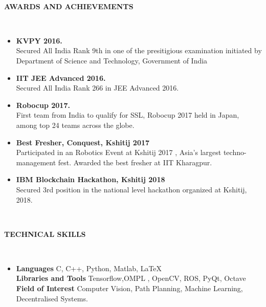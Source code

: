 \documentclass[a4paper,8pt]{article}
\newcommand{\lsep}{-0.5cm}
\newcommand{\resheading}[1]{{\small \colorbox{mygrey}{\begin{minipage}{0.975\textwidth}{\textbf{#1 \vphantom{p\^{E}}}}\end{minipage}}}}
\begin{document}
\hspace{0.5cm}\\[-0.2cm]
\resheading{\textbf{AWARDS AND ACHIEVEMENTS} }\\[\lsep]
\begin{itemize}
\item \noindent \textbf{KVPY 2016.} \\
Secured All India Rank 9th in one of the presitigious examination initiated by Department of Science and Technology, Government of India

\item \noindent \textbf{IIT JEE Advanced 2016.} \\
Secured All India Rank 266 in JEE Advanced 2016.

\item \noindent \textbf{Robocup 2017.} \\
First team from India to qualify for SSL, Robocup 2017 held in Japan, among top 24 teams across the globe.

\item \noindent \textbf{Best Fresher, Conquest, Kshitij 2017} \\
Participated in an Robotics Event at Kshitij 2017 , Asia’s largest techno-management fest. Awarded the best fresher at IIT Kharagpur.

\item \noindent \textbf{IBM Blockchain Hackathon, Kshitij 2018} \\
Secured 3rd position in the national level hackathon organized at Kshitij, 2018.

\end{itemize}

\hspace{0.5cm}\\[-0.2cm]
\resheading{\textbf{TECHNICAL SKILLS} }\\[\lsep]
\begin{itemize}
\item \noindent \textbf{Languages} C, C++, Python, Matlab, {\LaTeX{}} \\
\textbf{Libraries and Tools} Tensorflow,OMPL , OpenCV, ROS, PyQt, Octave \\
\textbf{Field of Interest} Computer Vision, Path Planning, Machine Learning, Decentralised Systems. \\
\end{itemize}
\end{document}
